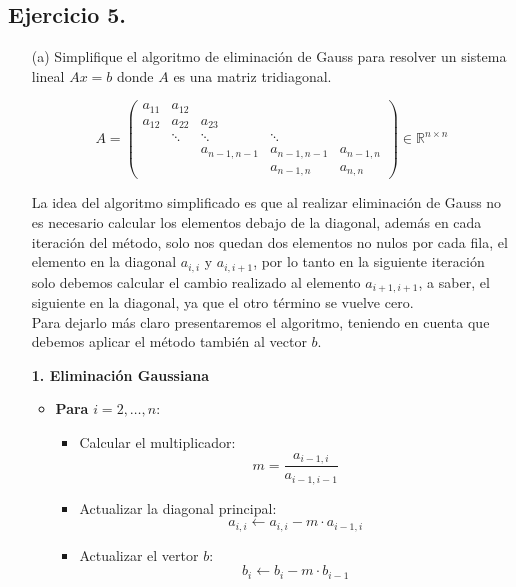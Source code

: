 
\subsection*{Ejercicio 5.}
\begin{enumerate}
    \item[(a)] Simplifique el algoritmo de eliminación de Gauss para resolver un sistema lineal $Ax = b$ donde $A$ es una matriz tridiagonal.

    $$
A=\left(\begin{array}{ccccc}
a_{11} & a_{12} & & & \\
a_{12} & a_{22} & a_{23} & & \\
& \ddots & \ddots & \ddots & \\
& & a_{n-1, n-1} & a_{n-1, n-1} & a_{n-1, n} \\
& & & a_{n-1, n} & a_{n, n}
\end{array}\right) \in \mathbb{R}^{n \times n}
$$

    \begin{solution}
        La idea del algoritmo simplificado es que al realizar eliminación de Gauss no es necesario calcular los elementos debajo de la diagonal, además en cada iteración del método, solo nos quedan dos elementos no nulos por cada fila, el elemento en la diagonal $a_{i,i}$ y $a_{i,i+1}$, por lo tanto en la siguiente iteración solo debemos calcular el cambio realizado al elemento $a_{i+1,i+1}$, a saber, el siguiente en la diagonal, ya que el otro término se vuelve cero.\\

        Para dejarlo más claro presentaremos el algoritmo, teniendo en cuenta que debemos aplicar el método también al vector $b$.

\textbf{1. Eliminación Gaussiana}

\begin{itemize}
    \item \textbf{Para} $i = 2,\ldots,n$:
    \begin{itemize}
        \item Calcular el multiplicador: 
        \[
        m = \frac{a_{i-1, i}}{a_{i-1, i-1}}
        \]
        \item Actualizar la diagonal principal:
        \[
        a_{i, i} \leftarrow a_{i, i} - m \cdot a_{i-1, i}
        \]
        \item Actualizar el vertor $b$:
        \[
        b_i \leftarrow b_i - m \cdot b_{i-1}
        \]
    \end{itemize}
\end{itemize}


\end{solution}
\end{enumerate}
